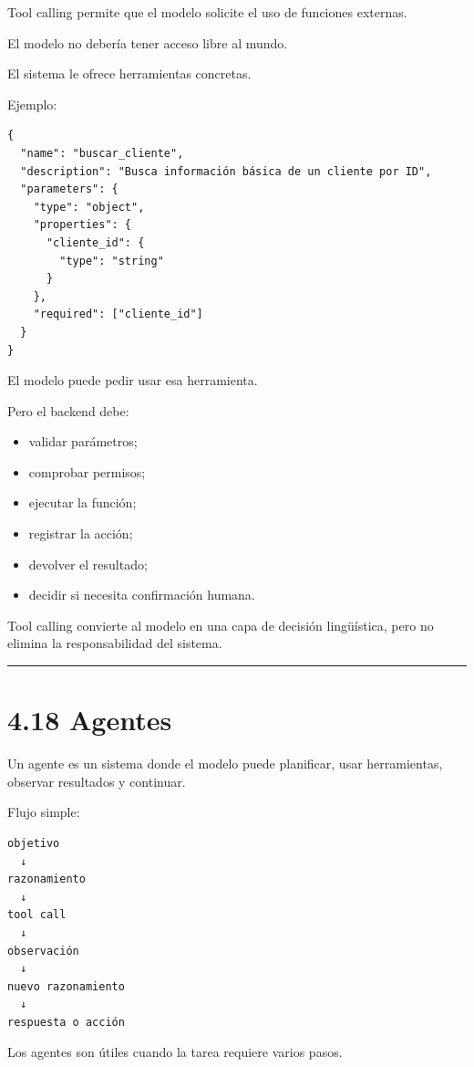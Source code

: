 Tool calling permite que el modelo solicite el uso de funciones
externas.

El modelo no debería tener acceso libre al mundo.

El sistema le ofrece herramientas concretas.

Ejemplo:

\begin{lstlisting}
{
  "name": "buscar_cliente",
  "description": "Busca información básica de un cliente por ID",
  "parameters": {
    "type": "object",
    "properties": {
      "cliente_id": {
        "type": "string"
      }
    },
    "required": ["cliente_id"]
  }
}
\end{lstlisting}

El modelo puede pedir usar esa herramienta.

Pero el backend debe:

\begin{itemize}
\tightlist
\item
  validar parámetros;
\item
  comprobar permisos;
\item
  ejecutar la función;
\item
  registrar la acción;
\item
  devolver el resultado;
\item
  decidir si necesita confirmación humana.
\end{itemize}

Tool calling convierte al modelo en una capa de decisión lingüística,
pero no elimina la responsabilidad del sistema.

\begin{center}\rule{0.5\linewidth}{0.5pt}\end{center}

\section{4.18 Agentes}\label{agentes-1}

Un agente es un sistema donde el modelo puede planificar, usar
herramientas, observar resultados y continuar.

Flujo simple:

\begin{lstlisting}
objetivo
  ↓
razonamiento
  ↓
tool call
  ↓
observación
  ↓
nuevo razonamiento
  ↓
respuesta o acción
\end{lstlisting}

Los agentes son útiles cuando la tarea requiere varios pasos.

